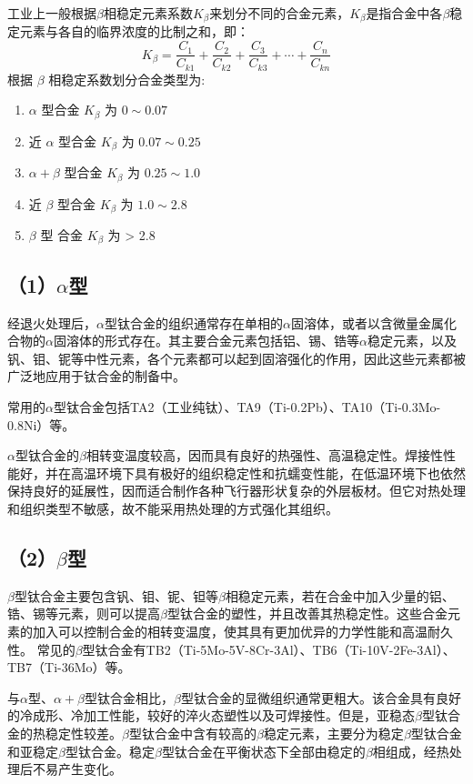 工业上一般根据$\beta$相稳定元素系数$K_{\beta}$来划分不同的合金元素，$K_{\beta}$是指合金中各$\beta$稳定元素与各自的临界浓度的比制之和，即：
$$
K_{\beta}=\frac{ C_{1} }{C_{k1}}+\frac{ C_{2} }{C_{k2}}+\frac{ C_{3} }{C_{k3}}+\cdots+\frac{ C_{n} }{C_{kn}}
$$
根据 $\beta$ 相稳定系数划分合金类型为:
\begin{enumerate}
	\item  $\alpha$ 型合金 $K_\beta$ 为 $0 \sim 0.07$
	\item 近 $\alpha$ 型合金 $K_\beta$ 为 $0.07 \sim 0.25$
	\item $\alpha+\beta$ 型合金 $K_\beta$ 为 $0.25 \sim 1.0$
	\item 近 $\beta$ 型合金 $K_\beta$ 为 $1.0 \sim 2.8$
	\item $\beta$ 型 合金 $K_\beta$ 为 > 2.8
\end{enumerate}
\subsection*{（1）$\alpha$型}
经退火处理后，$\alpha$型钛合金的组织通常存在单相的$\alpha$固溶体，或者以含微量金属化合物的$\alpha$固溶体的形式存在。其主要合金元素包括铝、锡、锆等$\alpha$稳定元素，以及钒、钼、铌等中性元素，各个元素都可以起到固溶强化的作用，因此这些元素都被广泛地应用于钛合金的制备中。

常用的$\alpha$型钛合金包括TA2（工业纯钛）、TA9（Ti-0.2Pb）、TA10（Ti-0.3Mo-0.8Ni）等。

$\alpha$型钛合金的$\beta$相转变温度较高，因而具有良好的热强性、高温稳定性。焊接性性能好，并在高温环境下具有极好的组织稳定性和抗蠕变性能，在低温环境下也依然保持良好的延展性，因而适合制作各种飞行器形状复杂的外层板材。但它对热处理和组织类型不敏感，故不能采用热处理的方式强化其组织\cite{TiandAl}。
\subsection*{（2）$\beta$型}
$\beta$型钛合金主要包含钒、钼、铌、钽等$\beta$相稳定元素，若在合金中加入少量的铝、锆、锡等元素，则可以提高$\beta$型钛合金的塑性，并且改善其热稳定性。这些合金元素的加入可以控制合金的相转变温度，使其具有更加优异的力学性能和高温耐久性。
常见的$\beta$型钛合金有TB2（Ti-5Mo-5V-8Cr-3Al）、TB6（Ti-10V-2Fe-3Al）、TB7（Ti-36Mo）等。

与$\alpha$型、$\alpha+\beta$型钛合金相比，$\beta$型钛合金的显微组织通常更粗大。该合金具有良好的冷成形、冷加工性能，较好的淬火态塑性以及可焊接性。但是，亚稳态$\beta$型钛合金的热稳定性较差。$\beta$型钛合金中含有较高的$\beta$稳定元素，主要分为稳定$\beta$型钛合金和亚稳定$\beta$型钛合金。稳定$\beta$型钛合金在平衡状态下全部由稳定的$\beta$相组成，经热处理后不易产生变化。
